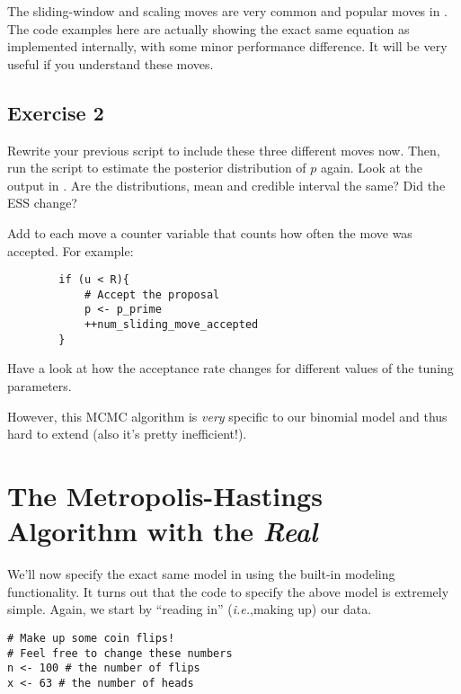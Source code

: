 \begin{framed}
The sliding-window and scaling moves are very common and popular moves in \RevBayes.
The code examples here are actually showing the exact same equation as implemented internally, with some minor performance difference.
It will be very useful if you understand these moves.	
\end{framed}




\subsection{Exercise 2}

Rewrite your previous script to include these three different moves now.
Then, run the script to estimate the posterior distribution of $p$ again.
Look at the output in \Tracer.
Are the distributions, mean and credible interval the same?
Did the ESS change?

\impmark Add to each move a counter variable that counts how often the move was accepted. For example:
{\tt \begin{snugshade*}
\begin{lstlisting}    
        if (u < R){
            # Accept the proposal
            p <- p_prime
            ++num_sliding_move_accepted
        } \end{lstlisting}
\end{snugshade*}}
Have a look at how the acceptance rate changes for different values of the tuning parameters.

However, this MCMC algorithm is \emph{very} specific to our binomial model and thus hard to extend (also it's pretty inefficient!).


\section{The Metropolis-Hastings Algorithm with the \emph{Real} \RevBayes}
We'll now specify the exact same model in \Rev using the built-in modeling functionality.
It turns out that the \Rev code to specify the above model is extremely simple.
Again, we start by ``reading in'' (\emph{i.e.},making up) our data.

{\tt \begin{snugshade*}
\begin{lstlisting}    
# Make up some coin flips!
# Feel free to change these numbers
n <- 100 # the number of flips
x <- 63	# the number of heads
\end{lstlisting}
\end{snugshade*}}

